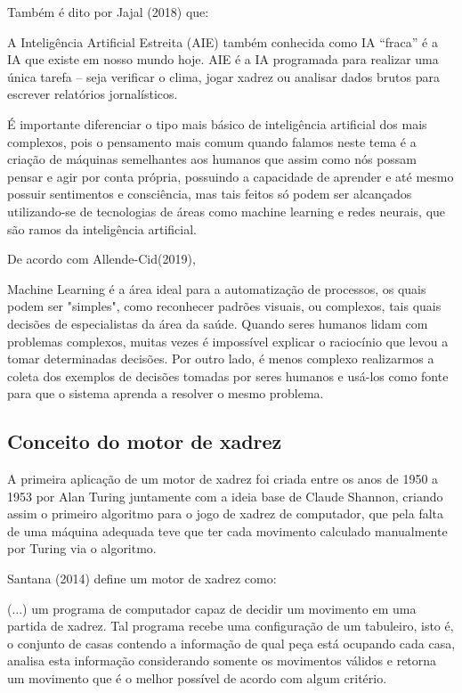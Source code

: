 Também é dito por Jajal (2018) que:
\begin{citacao}
    A Inteligência Artificial Estreita (AIE) também conhecida como IA “fraca” é a IA que existe em nosso mundo hoje.
    AIE é a IA programada para realizar uma única tarefa – seja verificar o clima, jogar xadrez ou analisar dados brutos
    para escrever relatórios jornalísticos.\cite[tradução nossa.]{JAJAL}
\end{citacao}

É importante diferenciar o tipo mais básico de inteligência artificial dos mais complexos, pois o pensamento mais comum
quando falamos neste tema é a criação de máquinas semelhantes aos humanos que assim como nós possam pensar e agir por conta
própria, possuindo a capacidade de aprender e até mesmo possuir sentimentos e consciência, mas tais feitos só podem ser
alcançados utilizando-se de tecnologias de áreas como machine learning e redes neurais, que são ramos da inteligência
artificial.

De acordo com Allende-Cid(2019),
\begin{citacao}
    Machine Learning é a área ideal para a automatização de processos, os quais podem ser "simples", como reconhecer padrões visuais, ou complexos,
    tais quais decisões de especialistas da área da saúde. Quando seres humanos lidam com problemas complexos, muitas vezes é impossível explicar o raciocínio
    que levou a tomar determinadas decisões. Por outro lado, é menos complexo realizarmos a coleta dos exemplos de decisões tomadas por seres humanos e usá-los
    como fonte para que o sistema aprenda a resolver o mesmo problema.\cite[tradução dos editores, p.16.]{ALLEND-CID}
\end{citacao}

\subsection{Conceito do motor de xadrez}
A primeira aplicação de um motor de xadrez foi criada entre os anos de 1950 a 1953 por Alan Turing juntamente com a ideia base
de Claude Shannon, criando assim o primeiro algoritmo para o jogo de xadrez de computador, que pela falta de uma máquina
adequada teve que ter cada movimento calculado manualmente por Turing via o algoritmo.

Santana (2014) define um motor de xadrez como:
\begin{citacao}
    (...) um programa de computador capaz de decidir um movimento em uma partida de xadrez. Tal programa recebe uma
    configuração de um tabuleiro, isto é, o conjunto de casas contendo a informação de qual peça está ocupando cada casa,
    analisa esta informação considerando somente os movimentos válidos e retorna um movimento que é o melhor possível de
    acordo com algum critério.\cite[p.4.]{SANTANA2014}
\end{citacao}

